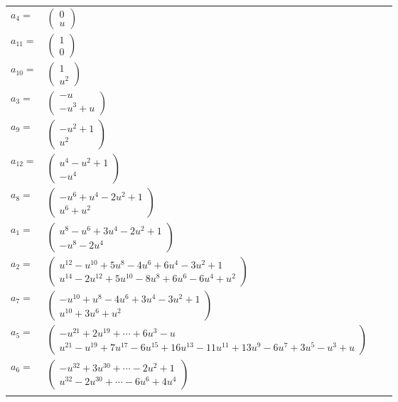 \documentclass[1p]{elsarticle_modified}
\theoremstyle{definition}
\begin{document}
\begin{tabular}{m{7pt} m{180pt} m{7pt} m{180pt} }
\flushright $a_{4}=$&$\begin{pmatrix}0\\u\end{pmatrix}$ \\
\flushright $a_{11}=$&$\begin{pmatrix}1\\0\end{pmatrix}$ \\
\flushright $a_{10}=$&$\begin{pmatrix}1\\u^2\end{pmatrix}$ \\
\flushright $a_{3}=$&$\begin{pmatrix}- u\\- u^3+u\end{pmatrix}$ \\
\flushright $a_{9}=$&$\begin{pmatrix}- u^2+1\\u^2\end{pmatrix}$ \\
\flushright $a_{12}=$&$\begin{pmatrix}u^4- u^2+1\\- u^4\end{pmatrix}$ \\
\flushright $a_{8}=$&$\begin{pmatrix}- u^6+u^4-2 u^2+1\\u^6+u^2\end{pmatrix}$ \\
\flushright $a_{1}=$&$\begin{pmatrix}u^8- u^6+3 u^4-2 u^2+1\\- u^8-2 u^4\end{pmatrix}$ \\
\flushright $a_{2}=$&$\begin{pmatrix}u^{12}- u^{10}+5 u^8-4 u^6+6 u^4-3 u^2+1\\u^{14}-2 u^{12}+5 u^{10}-8 u^8+6 u^6-6 u^4+u^2\end{pmatrix}$ \\
\flushright $a_{7}=$&$\begin{pmatrix}- u^{10}+u^8-4 u^6+3 u^4-3 u^2+1\\u^{10}+3 u^6+u^2\end{pmatrix}$ \\
\flushright $a_{5}=$&$\begin{pmatrix}- u^{21}+2 u^{19}+\cdots+6 u^3- u\\u^{21}- u^{19}+7 u^{17}-6 u^{15}+16 u^{13}-11 u^{11}+13 u^9-6 u^7+3 u^5- u^3+u\end{pmatrix}$ \\
\flushright $a_{6}=$&$\begin{pmatrix}- u^{32}+3 u^{30}+\cdots-2 u^2+1\\u^{32}-2 u^{30}+\cdots-6 u^6+4 u^4\end{pmatrix}$\\&\end{tabular}
\end{document}
